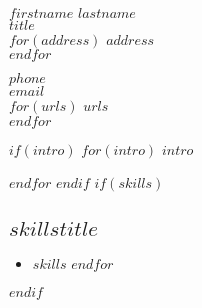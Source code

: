\documentclass[$fontsize$, a4paper, oneside]{article}
\begin{document}
\begin{minipage}[t]{0.4\linewidth}

{\LARGE $firstname$ $lastname$}\\
\vspace{\baselineskip}
{\Large \MakeLowercase{\textsc{$title$}}}\\
\vspace{\baselineskip}
$for(address)$
$address$\\
$endfor$
\vspace{\baselineskip}

\end{minipage}
\begin{minipage}[t]{0.4\linewidth}
\vspace{.63cm}

\href{tel:$phone$}{$phone$}\\
\href{mailto:$email$}{$email$}\\
\vspace{\baselineskip}
$for(urls)$
\href{http://$urls$}{$urls$}\\
$endfor$

\end{minipage}
\begin{minipage}[t]{0.2\linewidth}
\vspace{-1.4cm}
\begin{flushright}
\end{flushright}

\end{minipage}

$if(intro)$
\vspace{.915cm}
$for(intro)$
$intro$

\setlength\parindent{1em}
$endfor$
\setlength\parindent{0em}
$endif$
\vspace{4pt}
$if(skills)$
\subsection*{$skillstitle$}
\begin{itemize}
    $for(skills)$
      \item $skills$
    $endfor$
\end{itemize}
$endif$
\end{document}
